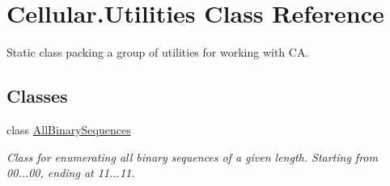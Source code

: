 \hypertarget{class_cellular_1_1_utilities}{}\section{Cellular.\+Utilities Class Reference}
\label{class_cellular_1_1_utilities}


Static class packing a group of utilities for working with C\+A.  


\subsection*{Classes}
\begin{DoxyCompactItemize}
\item 
class \hyperlink{class_cellular_1_1_utilities_1_1_all_binary_sequences}{All\+Binary\+Sequences}
\begin{DoxyCompactList}\small\item\em Class for enumerating all binary sequences of a given length. Starting from 00...00, ending at 11...11. \end{DoxyCompactList}\end{DoxyCompactItemize}
